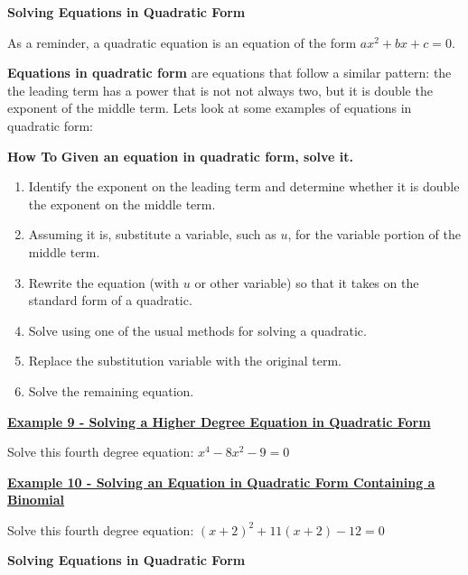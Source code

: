 \documentclass[12pt]{book}
\begin{document}
\newpage
{\large \textbf{Solving Equations in Quadratic Form}}
\vspace{3mm}

As a reminder, a quadratic equation is an equation of the form $ax^2 +bx+c=0$. 
\vspace{3mm}

\textbf{Equations in quadratic form} are equations that follow a similar pattern: the the leading term has a power that is not not always two, but it is double the exponent of the middle term. Lets look at some examples of equations in quadratic form: 

\vspace{40mm}

\begin{boxR}
\textbf{How To}
 \vspace{1mm}
    \hline
    \vspace{2mm}
    \textbf{Given an equation in quadratic form, solve it.}
    \begin{enumerate}
        \item Identify the exponent on the leading term and determine whether it is double the exponent on the middle term.
        \item Assuming it is, substitute a variable, such as $u$, for the variable portion of the middle term. 
        \item Rewrite the equation (with $u$ or other variable) so that it takes on the standard form of a quadratic.
        \item Solve using one of the usual methods for solving a quadratic.
        \item Replace the substitution variable with the original term.
        \item Solve the remaining equation.
    \end{enumerate}
\end{boxR}
\newpage
\underline{\textbf{Example 9 - Solving a Higher Degree Equation in Quadratic Form}}

Solve this fourth degree equation: $x^4-8x^2-9=0$

\vspace{75mm}
\underline{\textbf{Example 10 - Solving an Equation in Quadratic Form Containing a Binomial}}

Solve this fourth degree equation: $(x+2)^2+11(x+2)-12=0$

\newpage
{\large \textbf{Solving Equations in Quadratic Form}}
\vspace{3mm}
\end{document}
